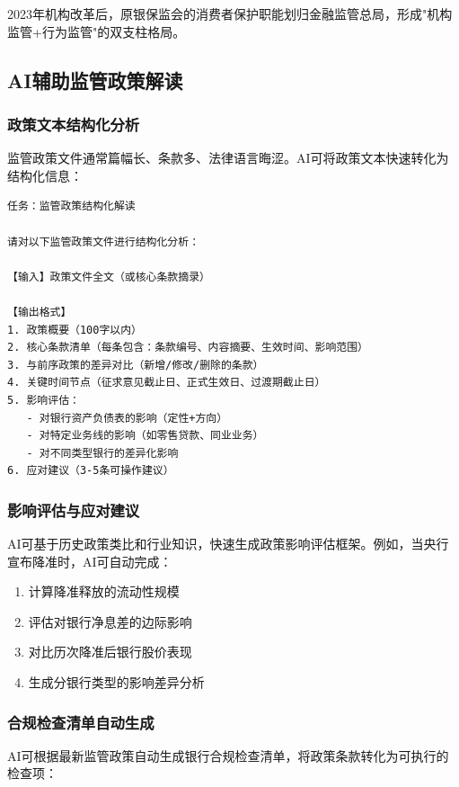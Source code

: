 2023年机构改革后，原银保监会的消费者保护职能划归金融监管总局，形成"机构监管+行为监管"的双支柱格局。

\subsection{AI辅助监管政策解读}

\subsubsection{政策文本结构化分析}

监管政策文件通常篇幅长、条款多、法律语言晦涩。AI可将政策文本快速转化为结构化信息：

\begin{lstlisting}
任务：监管政策结构化解读

请对以下监管政策文件进行结构化分析：

【输入】政策文件全文（或核心条款摘录）

【输出格式】
1. 政策概要（100字以内）
2. 核心条款清单（每条包含：条款编号、内容摘要、生效时间、影响范围）
3. 与前序政策的差异对比（新增/修改/删除的条款）
4. 关键时间节点（征求意见截止日、正式生效日、过渡期截止日）
5. 影响评估：
   - 对银行资产负债表的影响（定性+方向）
   - 对特定业务线的影响（如零售贷款、同业业务）
   - 对不同类型银行的差异化影响
6. 应对建议（3-5条可操作建议）
\end{lstlisting}

\subsubsection{影响评估与应对建议}

AI可基于历史政策类比和行业知识，快速生成政策影响评估框架。例如，当央行宣布降准时，AI可自动完成：

\begin{enumerate}[leftmargin=2em]
  \item 计算降准释放的流动性规模
  \item 评估对银行净息差的边际影响
  \item 对比历次降准后银行股价表现
  \item 生成分银行类型的影响差异分析
\end{enumerate}

\subsubsection{合规检查清单自动生成}

AI可根据最新监管政策自动生成银行合规检查清单，将政策条款转化为可执行的检查项：

